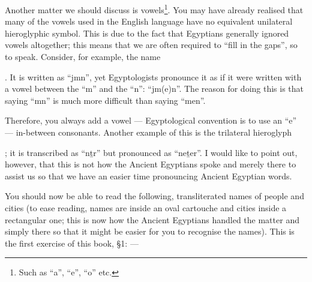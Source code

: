 \documentclass[a5paper,twoside,11pt]{report}
\begin{document}
		Another matter we should discuss is vowels\footnote{Such as “a”, “e”, “o” etc.}. You may have already realised that many of the vowels used in the English language have no equivalent unilateral hieroglyphic symbol. This is due to the fact that Egyptians generally ignored vowels altogether; this means that we are often required to “fill in the gaps”, so to speak. Consider, for example, the name \begin{hieroglyph}{\leavevmode {}\HinterSignsSpace
{}}\end{hieroglyph}. It is written as “jmn”, yet Egyptologists pronounce it as if it were written with a vowel between the “m” and the “n”: “jm(e)n”. The reason for doing this is that saying “mn” is much more difficult than saying “men”.

		Therefore, you always add a vowel — Egyptological convention is to use an “e” — in-between consonants. Another example of this is the trilateral hieroglyph \begin{hieroglyph}{\leavevmode {}}\end{hieroglyph}; it is transcribed as “nṯr” but pronounced as “neṯer”. I would like to point out, however, that this is not how the Ancient Egyptians spoke and merely there to assist us so that we have an easier time pronouncing Ancient Egyptian words. 

		You should now be able to read the following, transliterated names of people and cities (to ease reading, names are inside an oval cartouche and cities inside a rectangular one; this is now how the Ancient Egyptians handled the matter and simply there so that it might be easier for you to recognise the names). This is the first exercise of this book, §1: —
		
\end{document}
